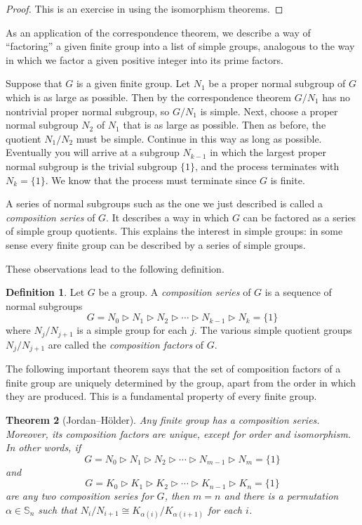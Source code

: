\documentclass[11pt,oneside]{article}
\newtheorem{thm}{Theorem}[section]
\theoremstyle{definition}
\newtheorem{defn}[thm]{Definition}
\newcommand{\Sym}{\mathbb{S}}
\newcommand{\morenormal}{\triangleright}
\begin{document}
\begin{proof}
This is an exercise in using the isomorphism theorems.
\end{proof}

As an application of the correspondence theorem, we describe a way of
``factoring'' a given finite group into a list of simple groups,
analogous to the way in which we factor a given positive integer
into its prime factors.  

Suppose that $G$ is a given finite group.  Let $N_1$ be a proper
normal subgroup of $G$ which is as large as possible.  Then by the
correspondence theorem $G/N_1$ has no nontrivial proper normal
subgroup, so $G/N_1$ is simple. Next, choose a proper normal subgroup
$N_2$ of $N_1$ that is as large as possible. Then as before, the
quotient $N_1/N_2$ must be simple. Continue in this way as long as
possible. Eventually you will arrive at a subgroup $N_{k-1}$ in which
the largest proper normal subgroup is the trivial subgroup $\{1\}$,
and the process terminates with $N_k = \{1\}$. We know that the
process must terminate since $G$ is finite.  

A series of normal subgroups such as the one we just described is
called a {\em composition series} of $G$. It describes a way in which
$G$ can be factored as a series of simple group quotients. This
explains the interest in simple groups: in some sense every finite
group can be described by a series of simple groups.

These observations lead to the following definition.


\begin{defn}
Let $G$ be a group. A {\em composition series} of $G$ is a sequence of
normal subgroups
\[
G = N_0 \morenormal N_1 \morenormal N_2 \morenormal \cdots \morenormal
N_{k-1} \morenormal N_k = \{1\}
\] 
where $N_j/N_{j+1}$ is a simple group for each $j$. The various
simple quotient groups $N_j/N_{j+1}$ are called the {\em composition
  factors} of $G$.
\end{defn}

The following important theorem says that the set of composition
factors of a finite group are uniquely determined by the group, apart
from the order in which they are produced. This is a fundamental
property of every finite group.


\begin{thm}[Jordan--H\"older]
Any finite group has a composition series. Moreover, its composition
factors are unique, except for order and isomorphism.  In other words,
if
\[
G = N_0 \morenormal N_1 \morenormal N_2 \morenormal \cdots \morenormal
N_{m-1} \morenormal N_m = \{1\}
\]
and
\[
G = K_0 \morenormal K_1 \morenormal K_2 \morenormal \cdots \morenormal
K_{n-1} \morenormal K_n = \{1\}
\]
are any two composition series for $G$, then $m=n$ and there is a
permutation $\alpha \in \Sym_n$ such that $N_i/N_{i+1} \cong
K_{\alpha(i)}/K_{\alpha(i+1)}$ for each $i$.
\end{thm}
\end{document}
